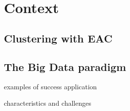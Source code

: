 
\section{Context}
\label{sec:context}

\subsection{Clustering with EAC}



\subsection{The Big Data paradigm}
\label{sec:bigdata}


examples of success application

characteristics and challenges

